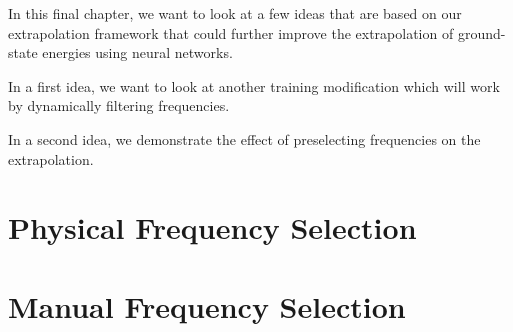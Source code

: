 
In this final chapter, we want to look at a few ideas that are based on our extrapolation framework that could further improve the extrapolation of ground-state energies using neural networks.

In a first idea, we want to look at another training modification which will work by dynamically filtering frequencies.

In a second idea, we demonstrate the effect of preselecting frequencies on the extrapolation.

\section{Physical Frequency Selection}

\section{Manual Frequency Selection}

